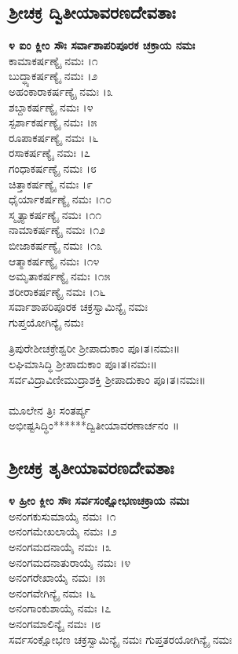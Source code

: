 \subsection{ಶ್ರೀಚಕ್ರ ದ್ವಿತೀಯಾವರಣದೇವತಾಃ}
{\bfseries ೪ ಐಂ ಕ್ಲೀಂ ಸೌಃ ಸರ್ವಾಶಾಪರಿಪೂರಕ ಚಕ್ರಾಯ ನಮಃ}\\
 ಕಾಮಾಕರ್ಷಣ್ಯೈ ನಮಃ ।೧\\
 ಬುದ್ಧ್ಯಾಕರ್ಷಣ್ಯೈ ನಮಃ ।೨\\
 ಅಹಂಕಾರಾಕರ್ಷಣ್ಯೈ ನಮಃ ।೩\\
 ಶಬ್ದಾಕರ್ಷಣ್ಯೈ ನಮಃ ।೪\\
 ಸ್ಪರ್ಶಾಕರ್ಷಣ್ಯೈ ನಮಃ ।೫\\
 ರೂಪಾಕರ್ಷಣ್ಯೈ ನಮಃ ।೬\\
 ರಸಾಕರ್ಷಣ್ಯೈ ನಮಃ ।೭\\
 ಗಂಧಾಕರ್ಷಣ್ಯೈ ನಮಃ ।೮\\
 ಚಿತ್ತಾಕರ್ಷಣ್ಯೈ ನಮಃ ।೯\\
 ಧೈರ್ಯಾಕರ್ಷಣ್ಯೈ ನಮಃ ।೧೦\\
 ಸ್ಮೃತ್ಯಾಕರ್ಷಣ್ಯೈ ನಮಃ ।೧೧\\
 ನಾಮಾಕರ್ಷಣ್ಯೈ ನಮಃ ।೧೨\\
 ಬೀಜಾಕರ್ಷಣ್ಯೈ ನಮಃ ।೧೩\\
 ಆತ್ಮಾಕರ್ಷಣ್ಯೈ ನಮಃ ।೧೪\\
 ಅಮೃತಾಕರ್ಷಣ್ಯೈ ನಮಃ ।೧೫\\
 ಶರೀರಾಕರ್ಷಣ್ಯೈ ನಮಃ ।೧೬\\
 ಸರ್ವಾಶಾಪರಿಪೂರಕ ಚಕ್ರಸ್ವಾಮಿನ್ಯೈ ನಮಃ\\
ಗುಪ್ತಯೋಗಿನ್ಯೈ ನಮಃ

 ತ್ರಿಪುರೇಶೀಚಕ್ರೇಶ್ವರೀ ಶ್ರೀಪಾದುಕಾಂ ಪೂ।ತ।ನಮಃ॥\\
 ಲಘಿಮಾಸಿದ್ಧಿ ಶ್ರೀಪಾದುಕಾಂ ಪೂ।ತ।ನಮಃ॥\\
 ಸರ್ವವಿದ್ರಾವಿಣೀಮುದ್ರಾಶಕ್ತಿ ಶ್ರೀಪಾದುಕಾಂ ಪೂ।ತ।ನಮಃ॥\\
\\
ಮೂಲೇನ ತ್ರಿಃ ಸಂತರ್ಪ್ಯ\\
 ಅಭೀಷ್ಟಸಿದ್ಧಿಂ******ದ್ವಿತೀಯಾವರಣಾರ್ಚನಂ ॥
\subsection{ಶ್ರೀಚಕ್ರ ತೃತೀಯಾವರಣದೇವತಾಃ}
{\bfseries ೪ ಹ್ರೀಂ ಕ್ಲೀಂ ಸೌಃ ಸರ್ವಸಂಕ್ಷೋಭಣಚಕ್ರಾಯ ನಮಃ}\\
 ಅನಂಗಕುಸುಮಾಯೈ ನಮಃ ।೧\\
 ಅನಂಗಮೇಖಲಾಯೈ ನಮಃ ।೨\\
 ಅನಂಗಮದನಾಯೈ ನಮಃ ।೩\\
 ಅನಂಗಮದನಾತುರಾಯೈ ನಮಃ ।೪\\
 ಅನಂಗರೇಖಾಯೈ ನಮಃ ।೫\\
 ಅನಂಗವೇಗಿನ್ಯೈ ನಮಃ ।೬\\
 ಅನಂಗಾಂಕುಶಾಯೈ ನಮಃ ।೭\\
 ಅನಂಗಮಾಲಿನ್ಯೈ ನಮಃ ।೮\\
 ಸರ್ವಸಂಕ್ಷೋಭಣ ಚಕ್ರಸ್ವಾಮಿನ್ಯೈ ನಮಃ
ಗುಪ್ತತರಯೋಗಿನ್ಯೈ ನಮಃ

